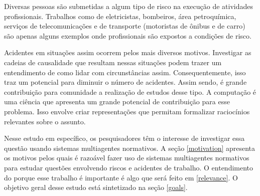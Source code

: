 Diversas pessoas são submetidas a algum tipo de risco na execução de atividades profissionais. Trabalhos como de eletricistas, bombeiros, área petroquímica, serviços de telecomunicações e de transporte (motoristas de ônibus e de carro) são apenas alguns exemplos onde profissionais são expostos a condições de risco.

Acidentes em situações assim ocorrem pelos mais diversos motivos. Investigar as cadeias de causalidade que resultam nessas situações podem trazer um entendimento de como lidar com circunstâncias assim. Consequentemente, isso traz um potencial para diminuir o número de acidentes. Assim sendo, é grande contribuição para comunidade a realização de estudos desse tipo. A computação é uma ciência que apresenta um grande potencial de contribuição para esse problema. Isso envolve criar representações que permitam formalizar raciocínios relevantes sobre o assunto.

Nesse estudo em específico, os pesquisadores têm o interesse de investigar essa questão usando sistemas multiagentes normativos. A seção \ref{motivation} apresenta os motivos pelos quais é razoável fazer uso de sistemas multiagentes normativos para estudar questões envolvendo riscos e acidentes de trabalho. O entendimento do porque esse trabalho é importante é algo que será feito em \ref{relevance}. O objetivo geral desse estudo está sintetizado na seção \ref{goals}.